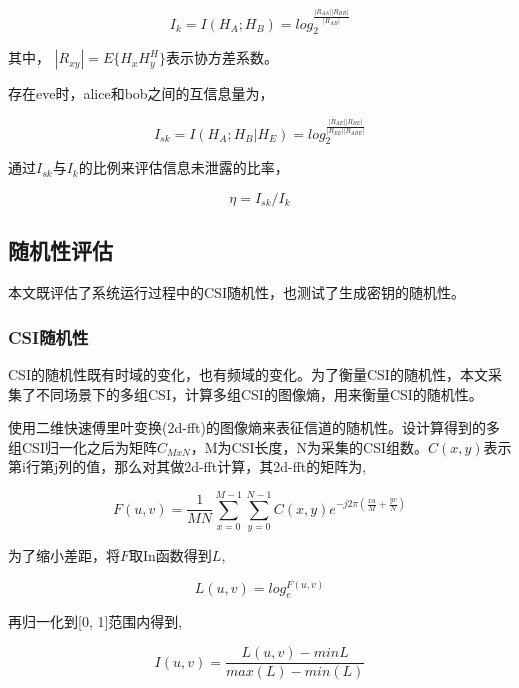 \documentclass[master]{seuthesis} %
\begin{document}
\begin{Main}
\begin{equation}
    I_k = I(H_A; H_B) = log_2^{\frac{\left|R_{AA}\right|\left|R_{BB}\right|}{\left|R_{AB}\right|}}
\end{equation}

其中， $\left|R_{xy}\right| = E\{H_x H_y^H\}$表示协方差系数。

存在eve时，alice和bob之间的互信息量为， 

\begin{equation}
  I_{sk} = I(H_A; H_B | H_E) = log_2^{\frac{\left|R_{AE}\right|\left|R_{BE}\right|}{\left|R_{EE}\right|\left|R_{ABE}\right|}}
\end{equation}

通过$I_{sk}$与$I_k$的比例来评估信息未泄露的比率，

\begin{equation}
  \eta = I_{sk} / I_k
\end{equation}

\subsection{随机性评估}

本文既评估了系统运行过程中的CSI随机性，也测试了生成密钥的随机性。

\subsubsection{CSI随机性}

CSI的随机性既有时域的变化，也有频域的变化。为了衡量CSI的随机性，本文采集了不同场景下的多组CSI，计算多组CSI的图像熵，用来衡量CSI的随机性。

使用二维快速傅里叶变换(2d-fft)的图像熵来表征信道的随机性。设计算得到的多组CSI归一化之后为矩阵$C_{MxN}$，M为CSI长度，N为采集的CSI组数。$C(x, y)$表示第i行第j列的值，那么对其做2d-fft计算，其2d-fft的矩阵为,

\begin{equation}
  F(u, v) = \frac{1}{MN}\sum_{x=0}^{M-1}\sum_{y=0}^{N-1} C(x,y) e^{-j2\pi(\frac{xu}{M}+\frac{yv}{N})}
\end{equation}


为了缩小差距，将$F$取In函数得到$L$,

\begin{equation}
  L(u, v) = log_e^{F(u, v)}
\end{equation}

再归一化到[0, 1]范围内得到,

\begin{equation}
  I(u, v) = \frac{L(u, v) - min{L}}{max(L) - min(L)}
\end{equation}


\end{Main}
\end{document}
